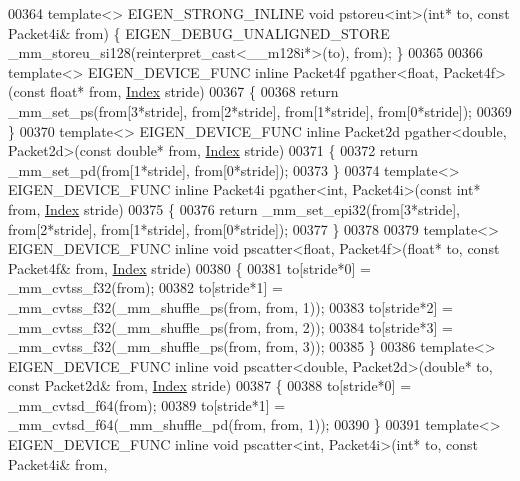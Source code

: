 \begin{DoxyCode}
00364 \textcolor{keyword}{template}<> EIGEN\_STRONG\_INLINE \textcolor{keywordtype}{void} pstoreu<int>(\textcolor{keywordtype}{int}*       to, \textcolor{keyword}{const} Packet4i& from) \{ 
      EIGEN\_DEBUG\_UNALIGNED\_STORE \_mm\_storeu\_si128(reinterpret\_cast<\_\_m128i*>(to), from); \}
00365 
00366 \textcolor{keyword}{template}<> EIGEN\_DEVICE\_FUNC \textcolor{keyword}{inline} Packet4f pgather<float, Packet4f>(\textcolor{keyword}{const} \textcolor{keywordtype}{float}* from, 
      \hyperlink{namespace_eigen_a62e77e0933482dafde8fe197d9a2cfde}{Index} stride)
00367 \{
00368  \textcolor{keywordflow}{return} \_mm\_set\_ps(from[3*stride], from[2*stride], from[1*stride], from[0*stride]);
00369 \}
00370 \textcolor{keyword}{template}<> EIGEN\_DEVICE\_FUNC \textcolor{keyword}{inline} Packet2d pgather<double, Packet2d>(\textcolor{keyword}{const} \textcolor{keywordtype}{double}* from, 
      \hyperlink{namespace_eigen_a62e77e0933482dafde8fe197d9a2cfde}{Index} stride)
00371 \{
00372  \textcolor{keywordflow}{return} \_mm\_set\_pd(from[1*stride], from[0*stride]);
00373 \}
00374 \textcolor{keyword}{template}<> EIGEN\_DEVICE\_FUNC \textcolor{keyword}{inline} Packet4i pgather<int, Packet4i>(\textcolor{keyword}{const} \textcolor{keywordtype}{int}* from, 
      \hyperlink{namespace_eigen_a62e77e0933482dafde8fe197d9a2cfde}{Index} stride)
00375 \{
00376  \textcolor{keywordflow}{return} \_mm\_set\_epi32(from[3*stride], from[2*stride], from[1*stride], from[0*stride]);
00377  \}
00378 
00379 \textcolor{keyword}{template}<> EIGEN\_DEVICE\_FUNC \textcolor{keyword}{inline} \textcolor{keywordtype}{void} pscatter<float, Packet4f>(\textcolor{keywordtype}{float}* to, \textcolor{keyword}{const} Packet4f& from, 
      \hyperlink{namespace_eigen_a62e77e0933482dafde8fe197d9a2cfde}{Index} stride)
00380 \{
00381   to[stride*0] = \_mm\_cvtss\_f32(from);
00382   to[stride*1] = \_mm\_cvtss\_f32(\_mm\_shuffle\_ps(from, from, 1));
00383   to[stride*2] = \_mm\_cvtss\_f32(\_mm\_shuffle\_ps(from, from, 2));
00384   to[stride*3] = \_mm\_cvtss\_f32(\_mm\_shuffle\_ps(from, from, 3));
00385 \}
00386 \textcolor{keyword}{template}<> EIGEN\_DEVICE\_FUNC \textcolor{keyword}{inline} \textcolor{keywordtype}{void} pscatter<double, Packet2d>(\textcolor{keywordtype}{double}* to, \textcolor{keyword}{const} Packet2d& from, 
      \hyperlink{namespace_eigen_a62e77e0933482dafde8fe197d9a2cfde}{Index} stride)
00387 \{
00388   to[stride*0] = \_mm\_cvtsd\_f64(from);
00389   to[stride*1] = \_mm\_cvtsd\_f64(\_mm\_shuffle\_pd(from, from, 1));
00390 \}
00391 \textcolor{keyword}{template}<> EIGEN\_DEVICE\_FUNC \textcolor{keyword}{inline} \textcolor{keywordtype}{void} pscatter<int, Packet4i>(\textcolor{keywordtype}{int}* to, \textcolor{keyword}{const} Packet4i& from, 

\end{DoxyCode}
